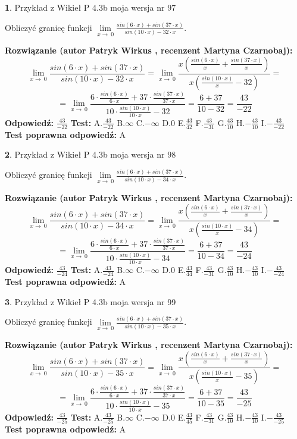 \documentclass[12pt, a4paper]{article}
\theoremstyle{definition} %
\newtheorem{zad}{}
\newcommand{\zadStart}[1]{\begin{zad}#1\newline}
\newcommand{\zadStop}{\end{zad}}
\newcommand{\rozwStart}[2]{\noindent \textbf{Rozwiązanie (autor #1 , recenzent #2): }\newline}
\newcommand{\rozwStop}{\newline}
\newcommand{\odpStart}{\noindent \textbf{Odpowiedź:}\newline}
\newcommand{\odpStop}{\newline}
\newcommand{\testStart}{\noindent \textbf{Test:}\newline}
\newcommand{\testStop}{\newline}
\newcommand{\kluczStart}{\noindent \textbf{Test poprawna odpowiedź:}\newline}
\newcommand{\kluczStop}{\newline}
\begin{document}
\zadStart{Przykład z Wikieł P 4.3b moja wersja nr 97}


Obliczyć granicę funkcji $\lim\limits_{x\to\ 0}\frac{sin(6 \cdot x)+sin(37 \cdot x)}{sin(10 \cdot x)-32 \cdot x}$.
\zadStop
\rozwStart{Patryk Wirkus}{Martyna Czarnobaj}
$$\lim\limits_{x\to\ 0}\frac{sin(6 \cdot x)+sin(37 \cdot x)}{sin(10 \cdot x)-32 \cdot x}=\lim\limits_{x\to\ 0}\frac{x(\frac{sin(6 \cdot x)}{x}+\frac{sin(37 \cdot x)}{x})}{x(\frac{sin(10 \cdot x)}{x}-32)}=$$
$$=\lim\limits_{x\to\ 0}\frac{6 \cdot \frac{sin(6 \cdot x)}{6 \cdot x}+37 \cdot \frac{sin(37 \cdot x)}{37 \cdot x}}{10 \cdot \frac{sin(10 \cdot x)}{10 \cdot x}-32}=\frac{6+37}{10-32} = \frac{43}{-22}$$
\rozwStop
\odpStart
$\frac{43}{-22}$
\odpStop
\testStart
A.$\frac{43}{-22}$
B.$\infty$
C.$-\infty$
D.$0$
E.$\frac{43}{42}$
F.$\frac{43}{-31}$
G.$\frac{43}{10}$
H.$-\frac{43}{10}$
I.$-\frac{43}{-22}$
\testStop
\kluczStart
A
\kluczStop



\zadStart{Przykład z Wikieł P 4.3b moja wersja nr 98}


Obliczyć granicę funkcji $\lim\limits_{x\to\ 0}\frac{sin(6 \cdot x)+sin(37 \cdot x)}{sin(10 \cdot x)-34 \cdot x}$.
\zadStop
\rozwStart{Patryk Wirkus}{Martyna Czarnobaj}
$$\lim\limits_{x\to\ 0}\frac{sin(6 \cdot x)+sin(37 \cdot x)}{sin(10 \cdot x)-34 \cdot x}=\lim\limits_{x\to\ 0}\frac{x(\frac{sin(6 \cdot x)}{x}+\frac{sin(37 \cdot x)}{x})}{x(\frac{sin(10 \cdot x)}{x}-34)}=$$
$$=\lim\limits_{x\to\ 0}\frac{6 \cdot \frac{sin(6 \cdot x)}{6 \cdot x}+37 \cdot \frac{sin(37 \cdot x)}{37 \cdot x}}{10 \cdot \frac{sin(10 \cdot x)}{10 \cdot x}-34}=\frac{6+37}{10-34} = \frac{43}{-24}$$
\rozwStop
\odpStart
$\frac{43}{-24}$
\odpStop
\testStart
A.$\frac{43}{-24}$
B.$\infty$
C.$-\infty$
D.$0$
E.$\frac{43}{44}$
F.$\frac{43}{-31}$
G.$\frac{43}{10}$
H.$-\frac{43}{10}$
I.$-\frac{43}{-24}$
\testStop
\kluczStart
A
\kluczStop



\zadStart{Przykład z Wikieł P 4.3b moja wersja nr 99}


Obliczyć granicę funkcji $\lim\limits_{x\to\ 0}\frac{sin(6 \cdot x)+sin(37 \cdot x)}{sin(10 \cdot x)-35 \cdot x}$.
\zadStop
\rozwStart{Patryk Wirkus}{Martyna Czarnobaj}
$$\lim\limits_{x\to\ 0}\frac{sin(6 \cdot x)+sin(37 \cdot x)}{sin(10 \cdot x)-35 \cdot x}=\lim\limits_{x\to\ 0}\frac{x(\frac{sin(6 \cdot x)}{x}+\frac{sin(37 \cdot x)}{x})}{x(\frac{sin(10 \cdot x)}{x}-35)}=$$
$$=\lim\limits_{x\to\ 0}\frac{6 \cdot \frac{sin(6 \cdot x)}{6 \cdot x}+37 \cdot \frac{sin(37 \cdot x)}{37 \cdot x}}{10 \cdot \frac{sin(10 \cdot x)}{10 \cdot x}-35}=\frac{6+37}{10-35} = \frac{43}{-25}$$
\rozwStop
\odpStart
$\frac{43}{-25}$
\odpStop
\testStart
A.$\frac{43}{-25}$
B.$\infty$
C.$-\infty$
D.$0$
E.$\frac{43}{45}$
F.$\frac{43}{-31}$
G.$\frac{43}{10}$
H.$-\frac{43}{10}$
I.$-\frac{43}{-25}$
\testStop
\kluczStart
A
\kluczStop
\end{document}
